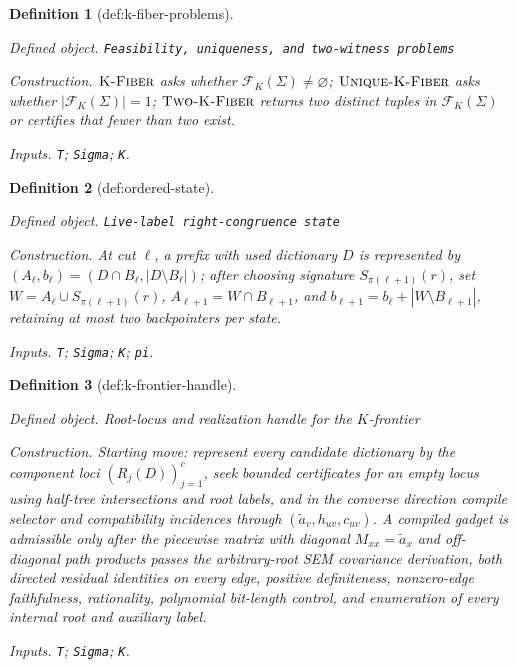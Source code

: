 \documentclass{article}
\newtheorem{definition}{Definition}
\begin{document}
\begin{definition}[def:k-fiber-problems]\label{def:k-fiber-problems}
\par\smallskip\noindent\emph{Defined object.} \texttt{Feasibility,\allowbreak{} uniqueness,\allowbreak{} and two-\allowbreak{}witness problems}
\par\smallskip\noindent\emph{Construction.} \(\textsc{K-Fiber}\) asks whether \(\mathcal F_K(\Sigma)\ne\varnothing\); \(\textsc{Unique-K-Fiber}\) asks whether \(|\mathcal F_K(\Sigma)|=1\); \(\textsc{Two-K-Fiber}\) returns two distinct tuples in \(\mathcal F_K(\Sigma)\) or certifies that fewer than two exist.
\par\smallskip\noindent\emph{Inputs.} \texttt{T}; \texttt{Sigma}; \texttt{K}.
\end{definition}

\begin{definition}[def:ordered-state]\label{def:ordered-state}
\par\smallskip\noindent\emph{Defined object.} \texttt{Live-\allowbreak{}label right-\allowbreak{}congruence state}
\par\smallskip\noindent\emph{Construction.} At cut \(\ell\), a prefix with used dictionary \(D\) is represented by \((A_\ell,b_\ell)=(D\cap B_\ell,|D\setminus B_\ell|)\); after choosing signature \(S_{\pi(\ell+1)}(r)\), set \(W=A_\ell\cup S_{\pi(\ell+1)}(r)\), \(A_{\ell+1}=W\cap B_{\ell+1}\), and \(b_{\ell+1}=b_\ell+|W\setminus B_{\ell+1}|\), retaining at most two backpointers per state.
\par\smallskip\noindent\emph{Inputs.} \texttt{T}; \texttt{Sigma}; \texttt{K}; \texttt{pi}.
\end{definition}

\begin{definition}[def:k-frontier-handle]\label{def:k-frontier-handle}
\par\smallskip\noindent\emph{Defined object.} Root-locus and realization handle for the \(K\)-frontier
\par\smallskip\noindent\emph{Construction.} Starting move: represent every candidate dictionary by the component loci \((R_j(D))_{j=1}^{c}\), seek bounded certificates for an empty locus using half-tree intersections and root labels, and in the converse direction compile selector and compatibility incidences through \((\widetilde a_v,h_{uv},c_{uv})\). A compiled gadget is admissible only after the piecewise matrix with diagonal \(M_{xx}=\widetilde a_x\) and off-diagonal path products passes the arbitrary-root SEM covariance derivation, both directed residual identities on every edge, positive definiteness, nonzero-edge faithfulness, rationality, polynomial bit-length control, and enumeration of every internal root and auxiliary label.
\par\smallskip\noindent\emph{Inputs.} \texttt{T}; \texttt{Sigma}; \texttt{K}.
\end{definition}
\end{document}
